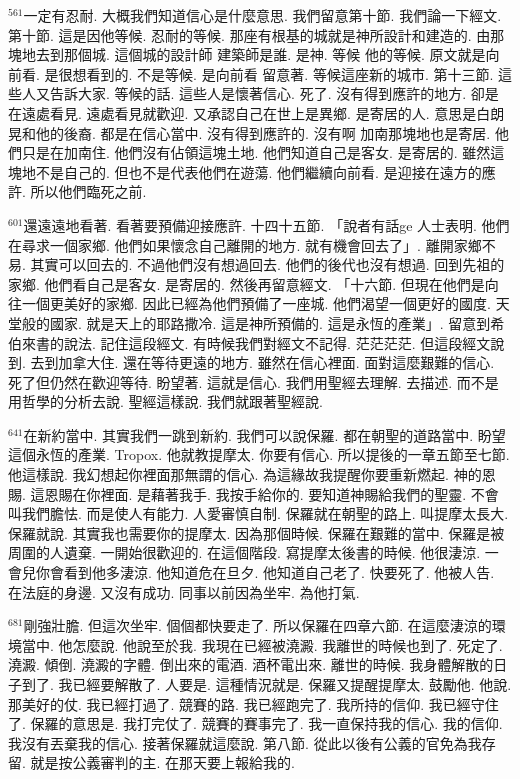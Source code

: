 \documentclass{book}
\begin{document}
$^{561}$一定有忍耐.
大概我們知道信心是什麼意思.
我們留意第十節.
我們論一下經文.
第十節.
這是因他等候.
忍耐的等候.
那座有根基的城就是神所設計和建造的.
由那塊地去到那個城.
這個城的設計師 建築師是誰.
是神.
等候 他的等候.
原文就是向前看.
是很想看到的.
不是等候.
是向前看 留意著.
等候這座新的城市.
第十三節.
這些人又告訴大家.
等候的話.
這些人是懷著信心.
死了.
沒有得到應許的地方.
卻是在遠處看見.
遠處看見就歡迎.
又承認自己在世上是異鄉.
是寄居的人.
意思是白朗晃和他的後裔.
都是在信心當中.
沒有得到應許的.
沒有啊 加南那塊地也是寄居.
他們只是在加南住.
他們沒有佔領這塊土地.
他們知道自己是客女.
是寄居的.
雖然這塊地不是自己的.
但也不是代表他們在遊蕩.
他們繼續向前看.
是迎接在遠方的應許.
所以他們臨死之前.

$^{601}$還遠遠地看著.
看著要預備迎接應許.
十四十五節.
「說者有話ge 人士表明.
他們在尋求一個家鄉.
他們如果懷念自己離開的地方.
就有機會回去了」.
離開家鄉不易.
其實可以回去的.
不過他們沒有想過回去.
他們的後代也沒有想過.
回到先祖的家鄉.
他們看自己是客女.
是寄居的.
然後再留意經文.
「十六節.
但現在他們是向往一個更美好的家鄉.
因此已經為他們預備了一座城.
他們渴望一個更好的國度.
天堂般的國家.
就是天上的耶路撒冷.
這是神所預備的.
這是永恆的產業」.
留意到希伯來書的說法.
記住這段經文.
有時候我們對經文不記得.
茫茫茫茫.
但這段經文說到.
去到加拿大住.
還在等待更遠的地方.
雖然在信心裡面.
面對這麼艱難的信心.
死了但仍然在歡迎等待.
盼望著.
這就是信心.
我們用聖經去理解.
去描述.
而不是用哲學的分析去說.
聖經這樣說.
我們就跟著聖經說.

$^{641}$在新約當中.
其實我們一跳到新約.
我們可以說保羅.
都在朝聖的道路當中.
盼望這個永恆的產業.
Tropox.
他就教提摩太.
你要有信心.
所以提後的一章五節至七節.
他這樣說.
我幻想起你裡面那無謂的信心.
為這緣故我提醒你要重新燃起.
神的恩賜.
這恩賜在你裡面.
是藉著我手.
我按手給你的.
要知道神賜給我們的聖靈.
不會叫我們膽怯.
而是使人有能力.
人愛審慎自制.
保羅就在朝聖的路上.
叫提摩太長大.
保羅就說.
其實我也需要你的提摩太.
因為那個時候.
保羅在艱難的當中.
保羅是被周圍的人遺棄.
一開始很歡迎的.
在這個階段.
寫提摩太後書的時候.
他很淒涼.
一會兒你會看到他多淒涼.
他知道危在旦夕.
他知道自己老了.
快要死了.
他被人告.
在法庭的身邊.
又沒有成功.
同事以前因為坐牢.
為他打氣.

$^{681}$剛強壯膽.
但這次坐牢.
個個都快要走了.
所以保羅在四章六節.
在這麼淒涼的環境當中.
他怎麼說.
他說至於我.
我現在已經被澆澱.
我離世的時候也到了.
死定了.
澆澱.
傾倒.
澆澱的字體.
倒出來的電酒.
酒杯電出來.
離世的時候.
我身體解散的日子到了.
我已經要解散了.
人要是.
這種情況就是.
保羅又提醒提摩太.
鼓勵他.
他說.
那美好的仗.
我已經打過了.
競賽的路.
我已經跑完了.
我所持的信仰.
我已經守住了.
保羅的意思是.
我打完仗了.
競賽的賽事完了.
我一直保持我的信心.
我的信仰.
我沒有丟棄我的信心.
接著保羅就這麼說.
第八節.
從此以後有公義的官免為我存留.
就是按公義審判的主.
在那天要上報給我的.
\end{document}
